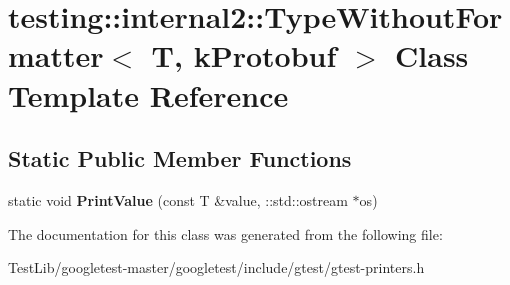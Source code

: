 \hypertarget{classtesting_1_1internal2_1_1TypeWithoutFormatter_3_01T_00_01kProtobuf_01_4}{}\section{testing\+:\+:internal2\+:\+:Type\+Without\+Formatter$<$ T, k\+Protobuf $>$ Class Template Reference}
\label{classtesting_1_1internal2_1_1TypeWithoutFormatter_3_01T_00_01kProtobuf_01_4}
\subsection*{Static Public Member Functions}
\begin{DoxyCompactItemize}
\item 
\mbox{\label{classtesting_1_1internal2_1_1TypeWithoutFormatter_3_01T_00_01kProtobuf_01_4_ac96fb775dc776f02da9a671ea0e04599}} 
static void {\bfseries Print\+Value} (const T \&value, \+::std\+::ostream $\ast$os)
\end{DoxyCompactItemize}


The documentation for this class was generated from the following file\+:\begin{DoxyCompactItemize}
\item 
Test\+Lib/googletest-\/master/googletest/include/gtest/gtest-\/printers.\+h\end{DoxyCompactItemize}
